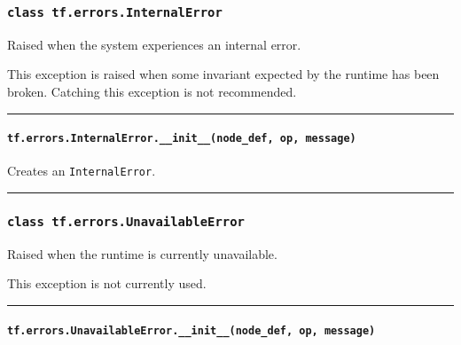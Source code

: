 \subsubsection{\texorpdfstring{\texttt{class\ tf.errors.InternalError}
}{class tf.errors.InternalError }}\label{class-tf.errors.internalerror}

Raised when the system experiences an internal error.

This exception is raised when some invariant expected by the runtime has
been broken. Catching this exception is not recommended.

\begin{center}\rule{0.5\linewidth}{\linethickness}\end{center}

\paragraph{\texorpdfstring{\texttt{tf.errors.InternalError.\_\_init\_\_(node\_def,\ op,\ message)}
}{tf.errors.InternalError.\_\_init\_\_(node\_def, op, message) }}\label{tf.errors.internalerror.ux5fux5finitux5fux5fnodeux5fdef-op-message}

Creates an \texttt{InternalError}.

\begin{center}\rule{0.5\linewidth}{\linethickness}\end{center}

\subsubsection{\texorpdfstring{\texttt{class\ tf.errors.UnavailableError}
}{class tf.errors.UnavailableError }}\label{class-tf.errors.unavailableerror}

Raised when the runtime is currently unavailable.

This exception is not currently used.

\begin{center}\rule{0.5\linewidth}{\linethickness}\end{center}

\paragraph{\texorpdfstring{\texttt{tf.errors.UnavailableError.\_\_init\_\_(node\_def,\ op,\ message)}
}{tf.errors.UnavailableError.\_\_init\_\_(node\_def, op, message) }}\label{tf.errors.unavailableerror.ux5fux5finitux5fux5fnodeux5fdef-op-message}

